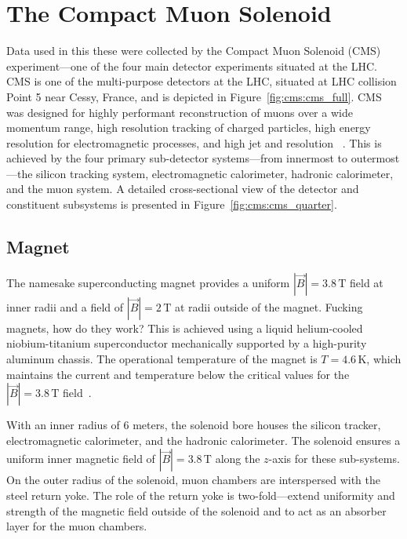 \section{The Compact Muon Solenoid}\label{ch:cms:CMS}
Data used in this these were collected by the Compact Muon Solenoid (CMS) experiment---one of the four main detector experiments situated at the LHC. CMS is one of the multi-purpose detectors at the LHC, situated at LHC collision Point 5 near Cessy, France, and is depicted in Figure~\ref{fig:cms:cms_full}. CMS was designed for highly performant reconstruction of muons over a wide momentum range, high resolution tracking of charged particles, high energy resolution for electromagnetic processes, and high jet and \met resolution ~\cite{Ball:2007zza,Bayatian:2006nff}. This is achieved by the four primary sub-detector systems---from innermost to outermost---the silicon tracking system, electromagnetic calorimeter, hadronic calorimeter, and the muon system. A detailed cross-sectional view of the detector and constituent subsystems is presented in Figure~\ref{fig:cms:cms_quarter}.


\subsection{Magnet}\label{ch:cms:magnet}
The namesake superconducting magnet provides a uniform $|\vec{B}| = 3.8 \,\mathrm{T}$ field at inner radii and a field of $|\vec{B}| = 2 \,\mathrm{T}$ at radii outside of the magnet. Fucking magnets, how do they work? This is achieved using a liquid helium-cooled niobium-titanium superconductor mechanically supported by a high-purity aluminum chassis. The operational temperature of the magnet is $T = 4.6 \,\mathrm{K}$, which maintains the current and temperature below the critical values for the $|\vec{B}| = 3.8 \,\mathrm{T}$ field~\cite{Acquistapace:1997fm}.

With an inner radius of 6 meters, the solenoid bore houses the silicon tracker, electromagnetic calorimeter, and the hadronic calorimeter. The solenoid ensures a uniform inner magnetic field of $|\vec{B}| = 3.8 \,\mathrm{T}$ along the $z$-axis for these sub-systems. On the outer radius of the solenoid, muon chambers are interspersed with the steel return yoke. The role of the return yoke is two-fold---extend uniformity and strength of the magnetic field outside of the solenoid and to act as an absorber layer for the muon chambers. 

